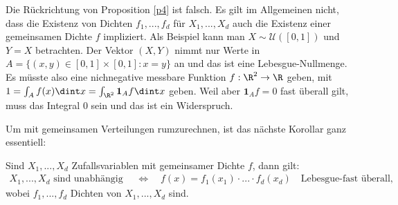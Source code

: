 \begin{bem}
	Die R\"uckrichtung von Proposition \ref{p4} ist falsch. Es gilt im Allgemeinen nicht, dass die Existenz von Dichten $f_1,...,f_d$ f\"ur $X_1, ..., X_d$ auch die Existenz einer gemeinsamen Dichte $f$ impliziert. Als Beispiel kann man $X\sim \mathcal U([0,1])$ und $Y=X$ betrachten. Der Vektor $(X,Y)$ nimmt nur Werte in $A=\{(x,y) \in [0,1]\times [0,1]:x=y\}$ an und das ist eine Lebesgue-Nullmenge. Es m\"usste also eine nichnegative messbare Funktion $f:\R^2\to \R$ geben, mit $1=\int_A f(x)\dint x=\int_{\R^2} \mathbf 1_{A} f \dint x$ geben. Weil aber $\mathbf 1_A f=0$ fast \"uberall gilt, muss das Integral $0$ sein und das ist ein Widerspruch.
\end{bem}
Um mit gemeinsamen Verteilungen rumzurechnen, ist das n\"achste Korollar ganz essentiell:
\begin{korollar}
	Sind $X_1,...,X_d$ Zufallsvariablen mit gemeinsamer Dichte $f$, dann gilt: 
	\begin{align*}	
		X_1,...,X_d\text{ sind unabhängig }\quad \Leftrightarrow \quad f(x) = f_1(x_1)\cdot ... \cdot f_d(x_d)\quad \text{Lebesgue-fast \"uberall},
	\end{align*}	
	wobei $f_1,...,f_d$ Dichten von $X_1,...,X_d$ sind.
\end{korollar}

